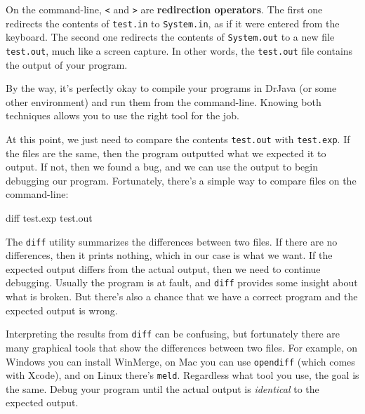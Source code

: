 \documentclass[12pt]{book}
\theoremstyle{exercise}
\newcommand{\java}[1]{\lstinline{#1}} %
\begin{document}

On the command-line, {\tt <} and {\tt >} are {\bf redirection operators}.
The first one redirects the contents of {\tt test.in} to \java{System.in}, as if it were entered from the keyboard.
The second one redirects the contents of \java{System.out} to a new file {\tt test.out}, much like a screen capture.
In other words, the {\tt test.out} file contains the output of your program.



By the way, it's perfectly okay to compile your programs in DrJava (or some other environment) and run them from the command-line.
Knowing both techniques allows you to use the right tool for the job.

At this point, we just need to compare the contents {\tt test.out} with {\tt test.exp}.
If the files are the same, then the program outputted what we expected it to output.
If not, then we found a bug, and we can use the output to begin debugging our program.
Fortunately, there's a simple way to compare files on the command-line:

\begin{stdout}
diff test.exp test.out
\end{stdout}

The {\tt diff} utility summarizes the differences between two files.
If there are no differences, then it prints nothing, which in our case is what we want.
If the expected output differs from the actual output, then we need to continue debugging.
Usually the program is at fault, and {\tt diff} provides some insight about what is broken.
But there's also a chance that we have a correct program and the expected output is wrong.

Interpreting the results from {\tt diff} can be confusing, but fortunately there are many graphical tools that show the differences between two files. For example, on Windows you can install WinMerge, on Mac you can use {\tt opendiff} (which comes with Xcode), and on Linux there's {\tt meld}. Regardless what tool you use, the goal is the same. Debug your program until the actual output is {\it identical} to the expected output.
\end{document}
